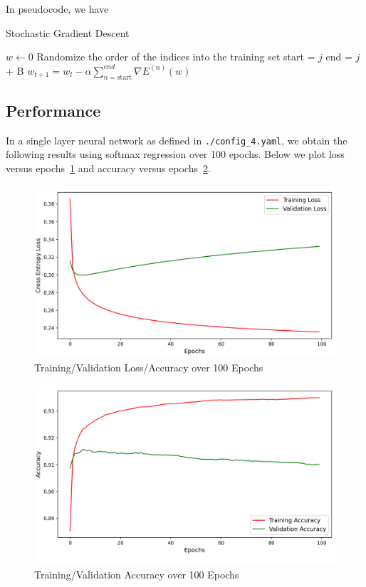 In pseudocode, we have

\begin{algorithm}
	\caption{Stochastic Gradient Descent}
	\begin{algorithmic}
		\State $w \gets 0$
		\State Randomize the order of the indices into the training set
		\State start = $j$
		\State end = $j$ + B
		\State $w_{t + 1} = w_t - \alpha \sum_{n = \text{start}}^{end} \nabla
			E^{(n)}(w) $
		\EndFor
		\EndFor
	\end{algorithmic}
\end{algorithm}

\subsection{Performance}

In a single layer neural network as defined in \texttt{./config\_4.yaml}, we
obtain the following results using softmax regression over 100 epochs. Below we
plot loss versus epochs~\ref{fig:loss} and accuracy versus epochs~\ref{fig:acc}.

\begin{figure}[ht]
	\centering
	\label{fig:loss}
	\includegraphics[width=1.0\textwidth]{./images/loss.png}
	\caption{Training/Validation Loss/Accuracy over 100 Epochs}
\end{figure}

\begin{figure}[!ht]
	\centering
	\label{fig:acc}
	\includegraphics[width=1.0\textwidth]{./images/acc.png}
	\caption{Training/Validation Accuracy over 100 Epochs}
\end{figure}
